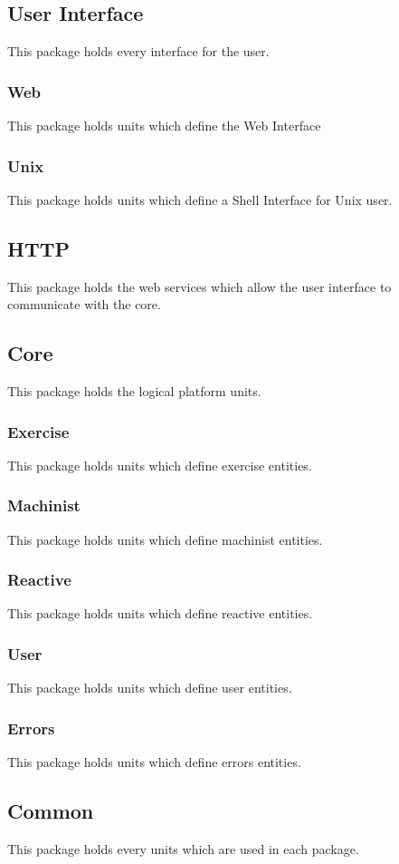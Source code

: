 	\subsection{User Interface}
		This package holds every interface for the user.
		\subsubsection{Web}
			This package holds units which define the Web Interface
		\subsubsection{Unix}
			This package holds units which define a Shell Interface for Unix user.
	\subsection{HTTP}
		This package holds the web services which allow the user interface to communicate with the core.
	\subsection{Core}
		This package holds the logical platform units.
		\subsubsection{Exercise}
			This package holds units which define exercise entities.
		\subsubsection{Machinist}
			This package holds units which define machinist entities.
		\subsubsection{Reactive}
			This package holds units which define reactive entities.
		\subsubsection{User}
			This package holds units which define user entities.
		\subsubsection{Errors}
			This package holds units which define errors entities.
	\subsection{Common}
		This package holds every units which are used in each package.


